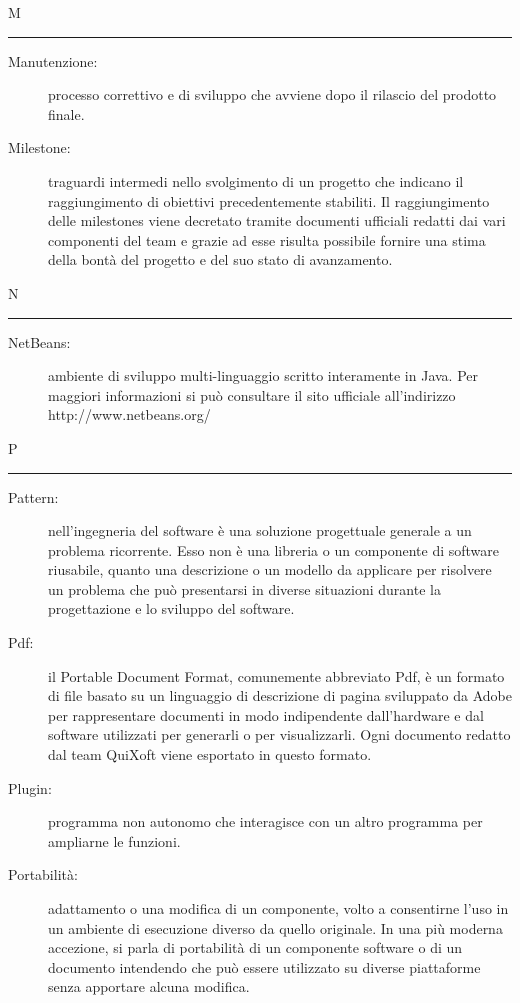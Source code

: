 \documentclass[11pt,a4paper]{article}
\begin{document}
\bigskip
\Huge M \bigskip
\hrule
\smallskip
\normalsize
\begin{description}
	\item[Manutenzione:] processo correttivo e di sviluppo che avviene dopo il rilascio del prodotto finale.
	\item[Milestone:] traguardi intermedi nello svolgimento di un progetto che indicano il raggiungimento di obiettivi precedentemente stabiliti. Il raggiungimento delle milestones viene decretato tramite documenti ufficiali redatti dai vari componenti del team e grazie ad esse risulta possibile fornire una stima della bontà del progetto e del suo stato di avanzamento.
\end{description}
\bigskip
\Huge N \bigskip
\hrule
\smallskip
\normalsize
\begin{description}
	\item[NetBeans:] ambiente di sviluppo multi-linguaggio scritto interamente in Java. Per maggiori informazioni si può consultare il sito ufficiale all'indirizzo http://www.netbeans.org/
\end{description}
\bigskip
\Huge P \bigskip
\hrule
\smallskip
\normalsize
\begin{description}
	\item[Pattern:] nell'ingegneria del software è una soluzione progettuale generale a un problema ricorrente. Esso non è una libreria o un componente di software riusabile, quanto una descrizione o un modello da applicare per risolvere un problema che può presentarsi in diverse situazioni durante la progettazione e lo sviluppo del software.
	\item[Pdf:] il Portable Document Format, comunemente abbreviato Pdf, è un formato di file basato su un linguaggio di descrizione di pagina sviluppato da Adobe per rappresentare documenti in modo indipendente dall'hardware e dal software utilizzati per generarli o per visualizzarli. Ogni documento redatto dal team QuiXoft viene esportato in questo formato.
	\item[Plugin:] programma non autonomo che interagisce con un altro programma per ampliarne le funzioni.
	\item[Portabilità:] adattamento o una modifica di un componente, volto a consentirne l'uso in un ambiente di esecuzione diverso da quello originale. In una più moderna accezione, si parla di portabilità di un componente software o di un documento intendendo che può essere utilizzato su diverse piattaforme senza apportare alcuna modifica.
\end{description}
\end{document}
